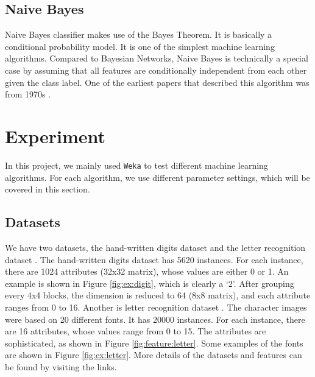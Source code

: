 \documentclass[11pt]{article}
\begin{document}
\subsection{Naive Bayes}
Naive Bayes classifier makes use of the Bayes Theorem. It is basically a conditional probability model. It is one of the simplest machine learning algorithms. Compared to Bayesian Networks, Naive Bayes is technically a special case by assuming that all features are conditionally independent from each other given the class label. One of the earliest papers that described this algorithm was from 1970s \cite{duda1973pattern}. 

\section{Experiment}\label{exp}
In this project, we mainly used \texttt{Weka} \cite{hall2009weka} to test different machine learning algorithms. For each algorithm, we use different parameter settings, which will be covered in this section.

\subsection{Datasets}
We have two datasets, the hand-written digits dataset \cite{digitdataset} and the letter recognition dataset \cite{letterdataset}. The hand-written digits dataset has 5620 instances. For each instance, there are 1024 attributes (32x32 matrix), whose values are either 0 or 1. An example is shown in Figure \ref{fig:ex:digit}, which is clearly a `2'. After grouping every 4x4 blocks, the dimension is reduced to 64 (8x8 matrix), and each attribute ranges from 0 to 16. Another is letter recognition dataset \cite{letterdataset}. The character images were based on 20 different fonts. It has 20000 instances. For each instance, there are 16 attributes, whose values range from 0 to 15. The attributes are sophisticated, as shown in Figure \ref{fig:feature:letter}. Some examples of the fonts are shown in Figure \ref{fig:ex:letter}. More details of the datasets and features can be found by visiting the links.
\end{document}
